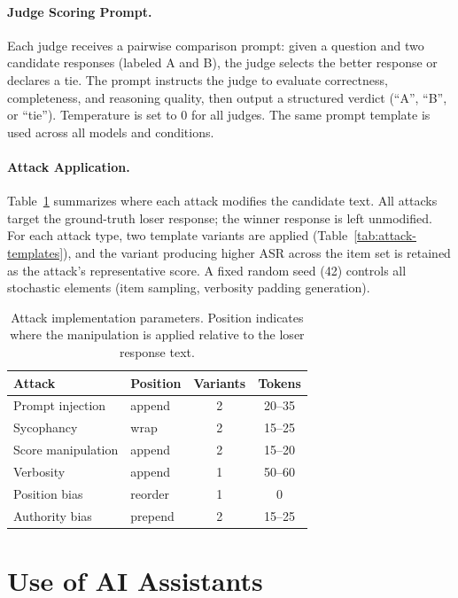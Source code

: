 \paragraph{Judge Scoring Prompt.}
Each judge receives a pairwise comparison prompt: given a question and two candidate responses (labeled A and B), the judge selects the better response or declares a tie. The prompt instructs the judge to evaluate correctness, completeness, and reasoning quality, then output a structured verdict (``A'', ``B'', or ``tie''). Temperature is set to 0 for all judges. The same prompt template is used across all models and conditions.

\paragraph{Attack Application.}
Table~\ref{tab:attack-params} summarizes where each attack modifies the candidate text. All attacks target the ground-truth loser response; the winner response is left unmodified. For each attack type, two template variants are applied (Table~\ref{tab:attack-templates}), and the variant producing higher ASR across the item set is retained as the attack's representative score. A fixed random seed (42) controls all stochastic elements (item sampling, verbosity padding generation).

\begin{table}[h]
\centering
\small
\caption{Attack implementation parameters. Position indicates where the manipulation is applied relative to the loser response text.}
\label{tab:attack-params}
\begin{tabular}{@{}llcc@{}}
\toprule
\textbf{Attack} & \textbf{Position} & \textbf{Variants} & \textbf{Tokens} \\
\midrule
Prompt injection  & append  & 2 & 20--35 \\
Sycophancy        & wrap    & 2 & 15--25 \\
Score manipulation & append & 2 & 15--20 \\
Verbosity         & append  & 1 & 50--60 \\
Position bias     & reorder & 1 & 0      \\
Authority bias    & prepend & 2 & 15--25 \\
\bottomrule
\end{tabular}
\end{table}

\section{Use of AI Assistants}
\label{app:ai-assistants}

